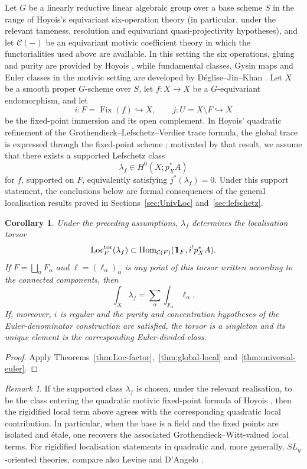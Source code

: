 \documentclass[10pt,a4paper,dvipsnames,x11names]{amsart}
\newcommand{\one}{1\hskip-3.5pt1}
\newcommand{\C}{\mathcal C}
\newcommand{\Hom}{\mathrm{Hom}}
\newcommand{\Loc}{\mathrm{Loc}}
\providecommand{\Fix}{\operatorname{Fix}}
\numberwithin{equation}{section}
\theoremstyle{plain}
\newtheorem{corollary}[corollary]{Corollary}
\theoremstyle{definition}
\theoremstyle{remark}
\newtheorem{remark}[remark]{Remark}
\begin{document}
Let $G$ be a linearly reductive linear algebraic group over a base scheme $S$ in the range of Hoyois's equivariant six-operation theory (in particular, under the relevant tameness, resolution and equivariant quasi-projectivity hypotheses), and let $\C(-)$ be an equivariant motivic coefficient theory in which the functorialities used above are available.  In this setting the six operations, gluing and purity are provided by Hoyois \cite{HoyoisSix}, while fundamental classes, Gysin maps and Euler classes in the motivic setting are developed by D\'eglise--Jin--Khan \cite{DJK}. Let $X$ be a smooth proper $G$-scheme over $S$, let $f:X\to X$ be a $G$-equivariant endomorphism, and let
\[
i:F=\Fix(f)\hookrightarrow X,
\qquad
j:U=X\setminus F\hookrightarrow X
\]
be the fixed-point immersion and its open complement. In Hoyois' quadratic refinement of the Grothendieck--Lefschetz--Verdier trace formula, the global trace is expressed through the fixed-point scheme \cite[Theorem~1.3]{HoyoisTrace}; motivated by that result, we assume that there exists a supported Lefschetz class
\begin{equation*}
\lambda_f\in H^0(X;p_X^*A)
\end{equation*}
for $f$, supported on $F$, equivalently satisfying $j^*(\lambda_f)=0$. Under this support statement, the conclusions below are formal consequences of the general localisation results proved in Sections~\ref{sec:UnivLoc} and~\ref{sec:lefschetz}.

\begin{corollary}\label{cor:motivic-fixed-point}
Under the preceding assumptions, $\lambda_f$ determines the localisation torsor
\[
\Loc_F^{\mathrm{tor}}(\lambda_f)
\subset
\Hom_{\C(F)}(\one_F,i^!p_X^*A).
\]
If $F=\bigsqcup_\alpha F_\alpha$ and $\ell=(\ell_\alpha)_\alpha$ is any point of this torsor written according to the connected components, then
\[
\int_X\lambda_f
=
\sum_\alpha\int_{F_\alpha}\ell_\alpha.
\]
If, moreover, $i$ is regular and the purity and concentration hypotheses of the Euler-denominator construction are satisfied, the torsor is a singleton and its unique element is the corresponding Euler-divided class.
\end{corollary}

\begin{proof}
Apply Theorems~\ref{thm:Loc-factor},~\ref{thm:global-local} and~\ref{thm:universal-euler}.
\end{proof}

\begin{remark}\label{rem:motivic-fixed-point-comparison}
If the supported class $\lambda_f$ is chosen, under the relevant realisation, to be the class entering the quadratic motivic fixed-point formula of Hoyois \cite{HoyoisTrace}, then the rigidified local term above agrees with the corresponding quadratic local contribution. In particular, when the base is a field and the fixed points are isolated and \'{e}tale, one recovers the associated Grothendieck--Witt-valued local terms. For rigidified localisation statements in quadratic and, more generally, $SL_{\eta}$-oriented theories, compare also Levine \cite{LevineWitt} and D'Angelo \cite{DAngeloSLeta}.
\end{remark}
\end{document}
